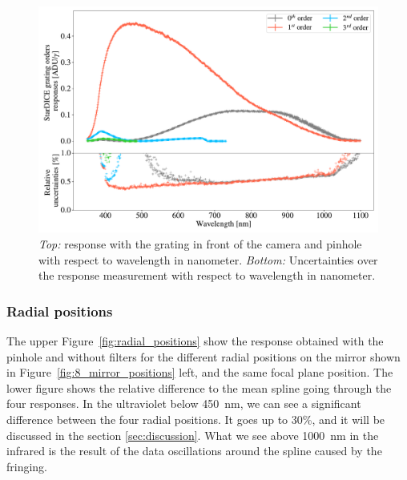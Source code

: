 \begin{figure}[h]
    \centering
    \includegraphics[width=\columnwidth]{fig/stardice_grating_response.pdf}
    \caption{\textit{Top:} \SD response with the grating in front of the camera and \spinhole pinhole with respect to wavelength in nanometer. \textit{Bottom:} Uncertainties over the \SD response measurement with respect to wavelength in nanometer.}
    \label{fig:stardice_grating_response}
\end{figure}

\subsubsection{Radial positions}

The upper Figure~\ref{fig:radial_positions} show the \SD response obtained with the \spinhole pinhole and without filters for the different radial positions on the mirror shown in Figure~\ref{fig:8_mirror_positions} left, and the same focal plane position. The lower figure shows the relative difference to the mean spline going through the four responses. In the ultraviolet below \SI{450}{\nm}, we can see a significant difference between the four radial positions. It goes up to 30\%, and it will be discussed in the section \ref{sec:discussion}. What we see above \SI{1000}{\nm} in the infrared is the result of the data oscillations around the spline caused by the fringing. 

